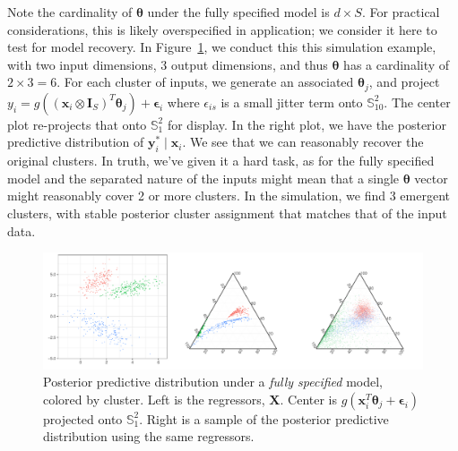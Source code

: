     Note the cardinality of $\bm{\theta}$ under the fully specified model is $d\times S$.  For practical
    considerations, this is likely overspecified in application; we consider it here to test
    for model recovery.  In Figure~\ref{fig:simreg}, we conduct this this simulation example, with two
    input dimensions, 3 output dimensions, and thus $\bm{\theta}$ has a cardinality of $2\times 3 = 6$.
    For each cluster of inputs, we generate an associated $\bm{\theta}_j$, and project 
    $y_i = g\left((\bm{x}_i\otimes\bm{I}_S)^T\bm{\theta}_j\right) + \bm{\epsilon}_i$ where 
    $\epsilon_{is}$ is a small jitter term onto 
    $\mathbb{S}_{10}^{2}$.  The center plot re-projects that onto $\mathbb{S}_1^{2}$ for display.
    In the right plot, we have the posterior predictive distribution of $\bm{y}_i^{*}\mid \bm{x}_i$.
    We see that we can reasonably recover the original clusters.  In truth, we've given it a hard
    task, as for the fully specified model and the separated nature of the inputs might mean that 
    a single $\bm{\theta}$ vector might reasonably cover 2 or more clusters.  In the simulation,
    we find 3 emergent clusters, with stable posterior cluster assignment that matches that of the 
    input data.

\begin{figure}[t]
    \centering
    \caption{Posterior predictive distribution under a \emph{fully specified} model, colored 
        by cluster.  Left is the regressors, $\bm{X}$.  Center is 
        $g(\bm{x}_i^T\bm{\theta}_j + \bm{\epsilon}_i)$ projected onto $\mathbb{S}_1^2$.  Right
        is a sample of the posterior predictive distribution using the same regressors.
        \label{fig:simreg}}
    \includegraphics[width = \textwidth]{plots/simulated_reg}
\end{figure}

